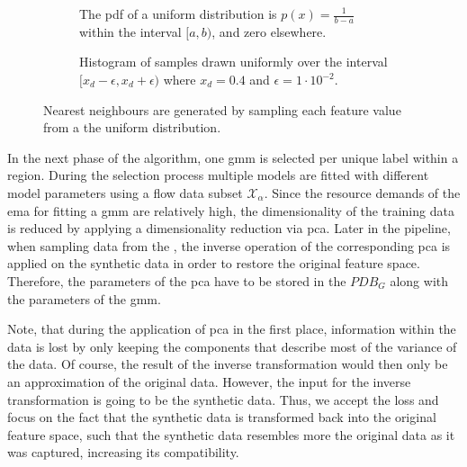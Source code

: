 \documentclass[../../main.tex]{subfiles}
\begin{document}
 \begin{figure}[t!]%
    \centering%
    \begin{subfigure}[b!]{0.49\textwidth}%
        \centering\captionsetup{width=.8\linewidth}%
        \caption{The pdf of a uniform distribution is $p(x) = \frac{1}{b-a}$ within the interval $[a, b)$, and zero elsewhere.}%
        \label{subfig:uniform_dist}%
    \end{subfigure}%
    \hfill%
    \begin{subfigure}[b!]{0.49\textwidth}%
        \centering\captionsetup{width=.8\linewidth}%
        \caption{Histogram of  samples drawn uniformly over the interval $[x_d-\epsilon, x_d+\epsilon)$ where $x_d=0.4$ and $\epsilon=1 \cdot 10^{-2}$.}%
        \label{subfig:hist_nn}%
    \end{subfigure}%
    \caption{Nearest neighbours are generated by sampling each feature value from a the uniform distribution.}%
    \label{fig:uniform_dist_nn}%
\end{figure}%

 In the next phase of the algorithm, one \acrshort{gmm} is selected per unique label within a region. During the selection process multiple models are fitted with different model parameters using a flow data subset $\mathcal{X}_\alpha$. Since the resource demands of the \gls{ema} for fitting a \acrshort{gmm} are relatively high, the dimensionality of the training data is reduced by applying a dimensionality reduction via \gls{pca}. Later in the pipeline, when sampling data from the , the inverse operation of the corresponding \gls{pca} is applied on the synthetic data in order to restore the original feature space. Therefore, the parameters of the \gls{pca} have to be stored in the $PDB_G$ along with the parameters of the \gls{gmm}. 
 
 Note, that during the application of \gls{pca} in the first place, information within the data is lost by only keeping the components that describe most of the variance of the data. Of course, the result of the inverse transformation would then only be an approximation of the original data. However, the input for the inverse transformation is going to be the synthetic data. Thus, we accept the loss and focus on the fact that the synthetic data is transformed back into the original feature space, such that the synthetic data resembles more the original data as it was captured, increasing its compatibility.
 
\end{document}
